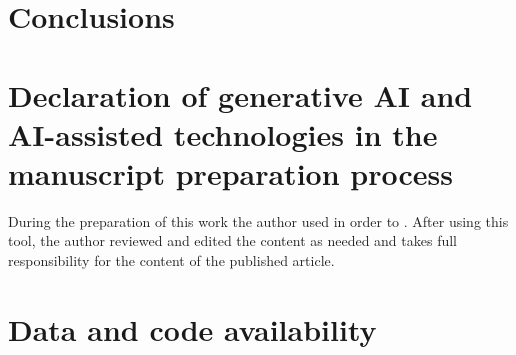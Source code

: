 \section{Conclusions}
\label{sec:conclusions}


\section*{Declaration of generative AI and AI-assisted technologies in the manuscript preparation process}
\label{sec:genai}

During the preparation of this work the author used  in order to . After using this tool, the author reviewed and edited the content as needed and takes full responsibility for the content of the published article.


\section*{Data and code availability}
